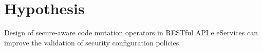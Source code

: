 \section{Hypothesis}

Design of secure-aware code mutation operators in RESTful API  e eServices can improve the validation of security configuration policies.
